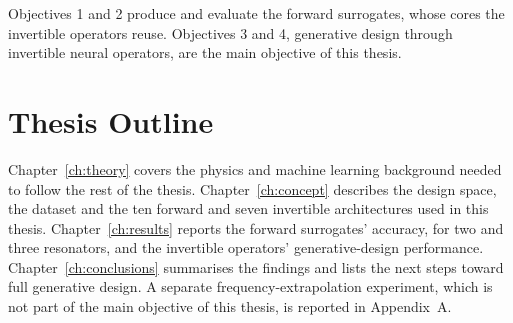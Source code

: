 Objectives 1 and 2 produce and evaluate the forward surrogates, whose cores the invertible operators reuse. Objectives 3 and 4, generative design through invertible neural operators, are the main objective of this thesis.

\section{Thesis Outline}

Chapter~\ref{ch:theory} covers the physics and machine learning background needed to follow the rest of the thesis. Chapter~\ref{ch:concept} describes the design space, the dataset and the ten forward and seven invertible architectures used in this thesis. Chapter~\ref{ch:results} reports the forward surrogates' accuracy, for two and three resonators, and the invertible operators' generative-design performance. Chapter~\ref{ch:conclusions} summarises the findings and lists the next steps toward full generative design. A separate frequency-extrapolation experiment, which is not part of the main objective of this thesis, is reported in Appendix~A.
